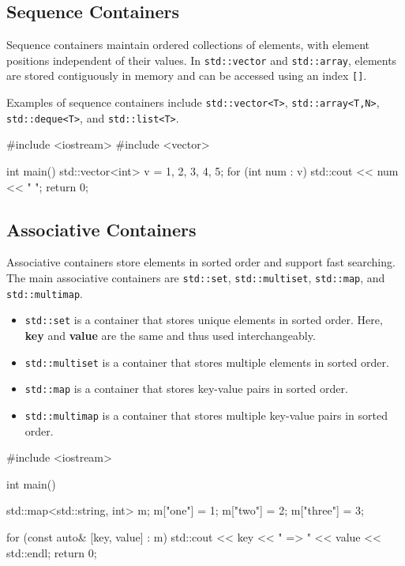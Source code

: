 \subsection{Sequence Containers}

Sequence containers maintain ordered collections of elements, with element positions independent of their values. In \texttt{std::vector} and \texttt{std::array}, elements are stored contiguously in memory and can be accessed using an index \texttt{[]}.

Examples of sequence containers include \texttt{std::vector<T>}, \texttt{std::array<T,N>}, \texttt{std::deque<T>}, and \texttt{std::list<T>}.

\begin{exampleblock}
    \begin{codeblock}[language=C++]
#include <iostream>
#include <vector>

int main() {
    std::vector<int> v = {1, 2, 3, 4, 5};
    for (int num : v) {
        std::cout << num << " ";
    }
    return 0;
}
    \end{codeblock}
\end{exampleblock}

\subsection{Associative Containers}

Associative containers store elements in sorted order and support fast searching. The main associative containers are \texttt{std::set}, \texttt{std::multiset}, \texttt{std::map}, and \texttt{std::multimap}.

\begin{itemize}
    \item \texttt{std::set} is a container that stores unique elements in sorted order. Here, \textbf{key} and \textbf{value} are the same and thus used interchangeably.
    \item \texttt{std::multiset} is a container that stores multiple elements in sorted order.
    \item \texttt{std::map} is a container that stores key-value pairs in sorted order.
    \item \texttt{std::multimap} is a container that stores multiple key-value pairs in sorted order.
\end{itemize}

\begin{exampleblock}
    \begin{codeblock}[language=C++]
#include <iostream>

int main() {
    std::map<std::string, int> m;
    m["one"] = 1;
    m["two"] = 2;
    m["three"] = 3;

    for (const auto& [key, value] : m) {
        std::cout << key << " => " << value << std::endl;
    }
    return 0;
}
    \end{codeblock}
\end{exampleblock}

